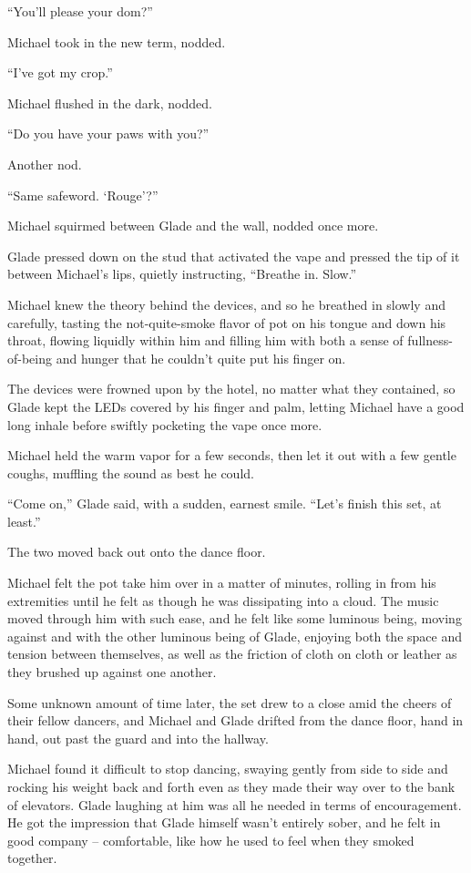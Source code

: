 ``You'll please your dom?''

Michael took in the new term, nodded.

``I've got my crop.''

Michael flushed in the dark, nodded.

``Do you have your paws with you?''

Another nod.

``Same safeword.  `Rouge'?''

Michael squirmed between Glade and the wall, nodded once more.

Glade pressed down on the stud that activated the vape and pressed the tip of it between Michael's lips, quietly instructing, ``Breathe in.  Slow.''

Michael knew the theory behind the devices, and so he breathed in slowly and carefully, tasting the not-quite-smoke flavor of pot on his tongue and down his throat, flowing liquidly within him and filling him with both a sense of fullness-of-being and hunger that he couldn't quite put his finger on.

The devices were frowned upon by the hotel, no matter what they contained, so Glade kept the LEDs covered by his finger and palm, letting Michael have a good long inhale before swiftly pocketing the vape once more.

Michael held the warm vapor for a few seconds, then let it out with a few gentle coughs, muffling the sound as best he could.

``Come on,'' Glade said, with a sudden, earnest smile.  ``Let's finish this set, at least.''

The two moved back out onto the dance floor.

Michael felt the pot take him over in a matter of minutes, rolling in from his extremities until he felt as though he was dissipating into a cloud.  The music moved through him with such ease, and he felt like some luminous being, moving against and with the other luminous being of Glade, enjoying both the space and tension between themselves, as well as the friction of cloth on cloth or leather as they brushed up against one another.

Some unknown amount of time later, the set drew to a close amid the cheers of their fellow dancers, and Michael and Glade drifted from the dance floor, hand in hand, out past the guard and into the hallway.

Michael found it difficult to stop dancing, swaying gently from side to side and rocking his weight back and forth even as they made their way over to the bank of elevators.  Glade laughing at him was all he needed in terms of encouragement.  He got the impression that Glade himself wasn't entirely sober, and he felt in good company -- comfortable, like how he used to feel when they smoked together.


